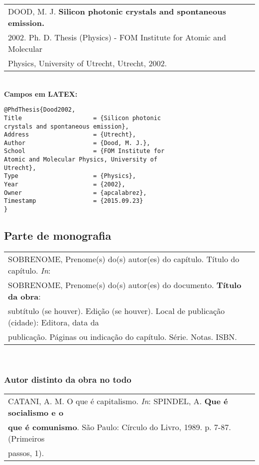 \begin{tabular}{|l|c|} \hline
	DOOD, M. J. \textbf{Silicon photonic crystals and spontaneous emission.} \\ 2002.
	 Ph. D. Thesis (Physics) - FOM Institute for Atomic and Molecular
	 \\ Physics, University of Utrecht, Utrecht, 2002.    \\\hline
\end{tabular} \\

\textbf{Campos em LATEX:} \\

\begin{verbatim}
@PhdThesis{Dood2002,
Title                    = {Silicon photonic
crystals and spontaneous emission},
Address                  = {Utrecht},
Author                   = {Dood, M. J.},
School                   = {FOM Institute for
Atomic and Molecular Physics, University of
Utrecht},
Type                     = {Physics},
Year                     = {2002},
Owner                    = {apcalabrez},
Timestamp                = {2015.09.23}
}
\end{verbatim}

\subsection{Parte de monografia}	

\begin{tabular}{|l|c|} \hline
	SOBRENOME, Prenome(s) do(s) autor(es) do capítulo. Título do capítulo. \textit{In}: \\ SOBRENOME, Prenome(s) do(s) autor(es) do documento. \textbf{Título da obra}: \\ subtítulo (se houver). Edição (se houver). Local de publicação (cidade): Editora, data da\\ publicação. P\'aginas ou indicação do capítulo. S\'erie. Notas. ISBN.     \\\hline
\end{tabular} \\

\subsubsection{Autor distinto da obra no todo} 

\begin{tabular}{|l|c|} \hline
	CATANI, A. M. O que \'e capitalismo. \textit{In}: SPINDEL, A. \textbf{Que \'e socialismo e o}\\ \textbf{que \'e comunismo}. São Paulo: Círculo do Livro, 1989. p. 7-87. (Primeiros \\passos, 1).    \\\hline
\end{tabular} \\

